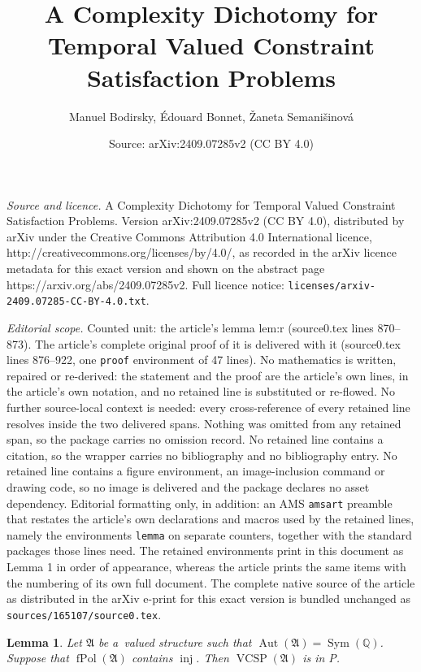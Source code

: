 \documentclass[10pt,a4paper]{amsart}
\title{A Complexity Dichotomy for Temporal Valued Constraint Satisfaction Problems}
\author{Manuel Bodirsky, \'Edouard Bonnet, \v{Z}aneta Semani\v{s}inov\'a}
\date{Source: arXiv:2409.07285v2 (CC BY 4.0)}
\newtheorem{lemma}{Lemma}
\DeclareMathOperator{\Aut}{Aut}
\newcommand{\Q}{\mathbb Q}
\DeclareMathOperator{\Sym}{Sym}
\newcommand{\bA}{{\mathfrak A}}
\DeclareMathOperator{\fPol}{fPol}
\DeclareMathOperator{\inj}{inj}
\DeclareMathOperator{\vcsp}{VCSP}
\begin{document}
\maketitle

\noindent\emph{Source and licence.} A Complexity Dichotomy for Temporal Valued Constraint Satisfaction Problems. Version arXiv:2409.07285v2 (CC BY 4.0), distributed by arXiv under the Creative Commons Attribution 4.0 International licence, http://creativecommons.org/licenses/by/4.0/, as recorded in the arXiv licence metadata for this exact version and shown on the abstract page https://arxiv.org/abs/2409.07285v2. Full licence notice: \texttt{licenses/arxiv-2409.07285-CC-BY-4.0.txt}.\par\smallskip

\noindent\textit{Editorial scope.} Counted unit: the article's lemma lem:r (source0.tex lines 870--873). The article's complete original proof of it is delivered with it (source0.tex lines 876--922, one \texttt{proof} environment of 47 lines). No mathematics is written, repaired or re-derived: the statement and the proof are the article's own lines, in the article's own notation, and no retained line is substituted or re-flowed.  No further source-local context is needed: every cross-reference of every retained line resolves inside the two delivered spans.  Nothing was omitted from any retained span, so the package carries no omission record.  No retained line contains a citation, so the wrapper carries no bibliography and no bibliography entry.  No retained line contains a figure environment, an image-inclusion command or drawing code, so no image is delivered and the package declares no asset dependency.  Editorial formatting only, in addition: an AMS \texttt{amsart} preamble that restates the article's own declarations and macros used by the retained lines, namely the environments \texttt{lemma} on separate counters, together with the standard packages those lines need.  The retained environments print in this document as Lemma 1 in order of appearance, whereas the article prints the same items with the numbering of its own full document.  The complete native source of the article as distributed in the arXiv e-print for this exact version is bundled unchanged as \texttt{sources/165107/source0.tex}.
\begin{lemma}\label{lem:r}
Let $\bA$ be a~valued structure such that $\Aut(\bA) = \Sym(\Q)$.
Suppose that $\fPol(\bA)$ contains $\inj$. Then $\vcsp(\bA)$ is in P. 
\end{lemma}
\end{document}
